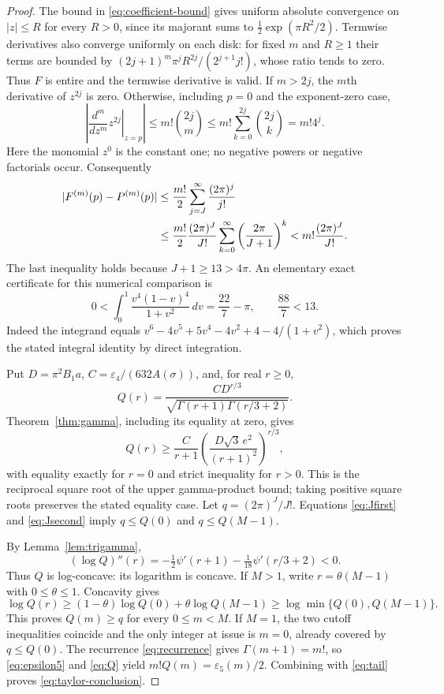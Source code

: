 \documentclass[11pt]{article}
\newcommand{\eps}{\varepsilon}
\begin{document}
\begin{proof}
The bound in \eqref{eq:coefficient-bound} gives uniform absolute
convergence on $|z|\le R$ for every $R>0$, since its majorant sums
to $\tfrac12\exp(\pi R^2/2)$. Termwise derivatives also converge
uniformly on each disk: for fixed $m$ and $R\ge1$ their terms are
bounded by $(2j+1)^m\pi^j R^{2j}/(2^{j+1}j!)$, whose ratio tends
to zero. Thus $F$ is entire and the termwise derivative is valid.
If $m>2j$, the $m$th derivative of $z^{2j}$ is zero. Otherwise,
including $p=0$ and the exponent-zero case,
\[
\left|\left.\frac{d^m}{dz^m}z^{2j}\right|_{z=p}\right|
\le m!\binom{2j}{m}\le m!\sum_{k=0}^{2j}\binom{2j}{k}
=m!4^j.
\]
Here the monomial $z^0$ is the constant one; no negative powers
or negative factorials occur. Consequently
\begin{align}
|F^{(m)}(p)-P^{(m)}(p)|
&\le\frac{m!}{2}\sum_{j=J}^\infty\frac{(2\pi)^j}{j!}\notag\\
&\le\frac{m!}{2}\frac{(2\pi)^J}{J!}
\sum_{k=0}^\infty\left(\frac{2\pi}{J+1}\right)^k
<m!\frac{(2\pi)^J}{J!}.\label{eq:tail}
\end{align}
The last inequality holds because $J+1\ge13>4\pi$.
An elementary exact certificate for this numerical comparison is
\[
0<\int_0^1\frac{v^4(1-v)^4}{1+v^2}\,dv
=\frac{22}{7}-\pi,\qquad \frac{88}{7}<13.
\]
Indeed the integrand equals
$v^6-4v^5+5v^4-4v^2+4-4/(1+v^2)$, which proves the stated
integral identity by direct integration.

Put $D=\pi^2B_1a$, $C=\eps_4/(632A(\sigma))$, and, for real $r\ge0$,
\begin{equation}\label{eq:Q}
Q(r)=\frac{CD^{r/3}}{\sqrt{\Gamma(r+1)\Gamma(r/3+2)}}.
\end{equation}
Theorem~\ref{thm:gamma}, including its equality at zero, gives
\begin{equation}\label{eq:Qlower}
Q(r)\ge\frac{C}{r+1}
\left(\frac{D\sqrt3\,e^2}{(r+1)^2}\right)^{r/3},
\end{equation}
with equality exactly for $r=0$ and strict inequality for $r>0$.
This is the reciprocal square root of the upper gamma-product
bound; taking positive square roots preserves the stated equality
case. Let $q=(2\pi)^J/J!$. Equations \eqref{eq:Jfirst} and
\eqref{eq:Jsecond} imply $q\le Q(0)$ and $q\le Q(M-1)$.

By Lemma~\ref{lem:trigamma},
\begin{equation}\label{eq:Qconcavity}
(\log Q)''(r)=-\tfrac12\psi'(r+1)
-\tfrac1{18}\psi'(r/3+2)<0.
\end{equation}
Thus $Q$ is log-concave: its logarithm is concave. If $M>1$,
write $r=\theta(M-1)$ with $0\le\theta\le1$. Concavity gives
\[
\log Q(r)\ge(1-\theta)\log Q(0)+\theta\log Q(M-1)
\ge\log\min\{Q(0),Q(M-1)\}.
\]
This proves $Q(m)\ge q$ for every $0\le m<M$.
If $M=1$, the two cutoff inequalities coincide and the only
integer at issue is $m=0$, already covered by $q\le Q(0)$.
The recurrence \eqref{eq:recurrence} gives $\Gamma(m+1)=m!$,
so \eqref{eq:epsilon5} and \eqref{eq:Q} yield
$m!Q(m)=\eps_5(m)/2$. Combining with \eqref{eq:tail} proves
\eqref{eq:taylor-conclusion}.


\end{proof}
\end{document}
